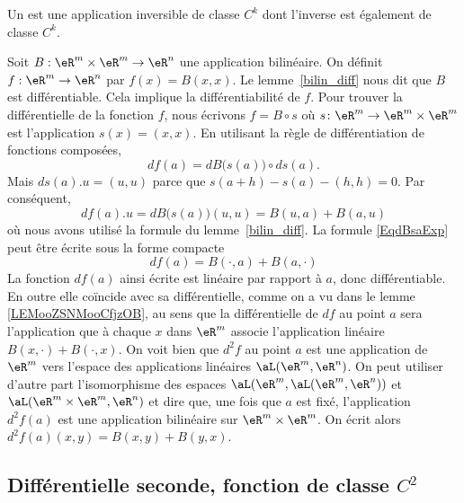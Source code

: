 \begin{definition}
    Un  est une application inversible de classe \( C^k\) dont l'inverse est également de classe \( C^k\).
\end{definition}

\begin{example}\label{bilin_2diff}
	Soit $B:\eR^m\times \eR^m\to\eR^n$ une application bilinéaire. On définit $f:\eR^m\to\eR^n$ par $f(x)=B(x,x)$. Le lemme~\ref{bilin_diff} nous dit que $B$ est différentiable. Cela implique la différentiabilité de $f$. Pour trouver la différentielle de la fonction $f$, nous écrivons $f=B\circ s$ où $s\colon \eR^m\to \eR^m\times\eR^m$ est l'application $s(x)=(x,x)$. En utilisant la règle de différentiation de fonctions composées,
	\begin{equation}
		df(a)=dB\big( s(a) \big)\circ ds(a).
	\end{equation}
	Mais $ds(a).u=(u,u)$ parce que $s(a+h)-s(a)-(h,h)=0$. Par conséquent,
	\begin{equation}		\label{EqdBsaExp}
		df(a).u=dB\big( s(a) \big)(u,u)=B(u,a)+B(a,u)
	\end{equation}
	où nous avons utilisé la formule du lemme~\ref{bilin_diff}. La formule \eqref{EqdBsaExp} peut être écrite sous la forme compacte
	\begin{equation}
		df(a)=B(\cdot,a)+B(a,\cdot)
	\end{equation}
    La fonction $df(a)$ ainsi écrite est linéaire par rapport à $a$, donc différentiable. En outre elle coïncide avec sa différentielle, comme on a vu dans le lemme \ref{LEMooZSNMooCfjzOB}, au sens que la différentielle de $df$ au point $a$ sera l'application que à chaque $x$ dans $\eR^m$ associe l'application linéaire $B(x,\cdot)+B(\cdot, x)$. On voit bien que $d^2f$ au point $a$ est une application de $\eR^m$ vers l'espace des applications linéaires $\aL(\eR^m, \eR^n)$. On peut utiliser d'autre part l'isomorphisme des espaces $\aL(\eR^m,\aL(\eR^m, \eR^n) )$ et $\aL(\eR^m\times\eR^m, \eR^n )$ et dire que, une fois que $a$ est fixé, l'application $d^2f(a)$ est une application bilinéaire sur $\eR^m\times\eR^m$. On écrit alors $d^2f(a)(x,y)=B(x,y)+B(y,x)$.
\end{example}

\subsection{Différentielle seconde, fonction de classe \texorpdfstring{$ C^2$}{C2}}

